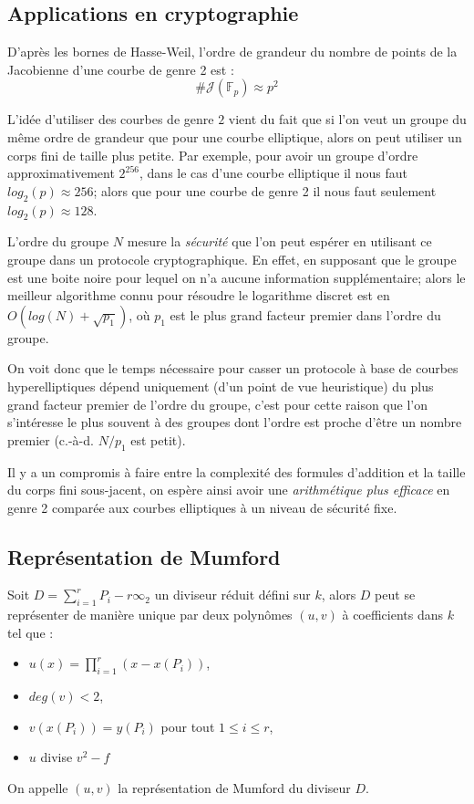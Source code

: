 \documentclass[a4paper,12pt]{article}
\theoremstyle{definition}
\theoremstyle{remark}
\numberwithin{equation}{section}
\begin{document}
\subsection{Applications en cryptographie}
D'après les bornes de Hasse-Weil, l'ordre de grandeur du nombre de points de la Jacobienne d'une courbe de genre 2 est :
$$\#\mathcal{J}(\mathbb{F}_p) \approx p^2$$

L'idée d'utiliser des courbes de genre $2$ vient du fait que si l'on veut un groupe du même ordre de grandeur que pour une courbe elliptique, alors on peut utiliser un corps fini de taille plus petite. Par exemple, pour avoir un groupe d'ordre approximativement $2^{256}$, dans le cas d'une courbe elliptique il nous faut $log_2(p) \approx 256$; alors que pour une courbe de genre 2 il nous faut seulement $log_2(p) \approx 128$.

L'ordre du groupe $N$ mesure la \emph{sécurité} que l'on peut espérer en utilisant ce groupe dans un protocole cryptographique.
En effet, en supposant que le groupe est une boite noire pour lequel on n'a aucune information supplémentaire; alors le meilleur algorithme connu pour résoudre le logarithme discret est en $O(log(N)+\sqrt{p_1})$, où $p_1$ est le plus grand facteur premier dans l'ordre du groupe.

On voit donc que le temps nécessaire pour casser un protocole à base de courbes hyperelliptiques dépend uniquement (d'un point de vue heuristique) du plus grand facteur premier de l'ordre du groupe, c'est pour cette raison que l'on s'intéresse le plus souvent à des groupes dont l'ordre est proche d'être un nombre premier (c.-à-d. $N/p_1$ est petit).

Il y a un compromis à faire entre la complexité des formules d'addition et la taille du corps fini sous-jacent, on espère ainsi avoir une \emph{arithmétique plus efficace} en genre 2 comparée aux courbes elliptiques à un niveau de sécurité fixe.
 
\subsection{Représentation de Mumford}
Soit $D = \sum_{i=1}^r{P_i} - r\infty_2$ un diviseur réduit défini sur $k$, alors $D$ peut se représenter de manière unique par deux polynômes $(u,v)$ à coefficients dans $k$ tel que :
\begin{itemize}
\item $u(x) =  \prod_{i=1}^r (x - x(P_i) )$,
\item $deg(v) < 2$,
\item $v(x(P_i)) = y(P_i)$ pour tout $1 \leq i \leq r$,
\item $u$ divise $v^2 - f$
\end{itemize}
On appelle $(u,v)$ la représentation de Mumford du diviseur $D$.
\end{document}
